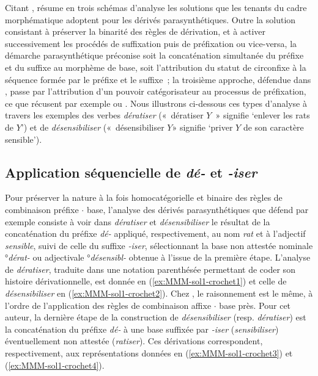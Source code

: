 \documentclass[output=paper]{langsci/langscibook}
\begin{document}
Citant \citet[23-74]{serrano1995.parasinteticas}, \citet[167]{iacobini2004.parasintesi} résume en trois schémas d'analyse les solutions que les tenants du cadre morphématique adoptent pour les dérivés parasynthétiques. Outre la solution consistant à préserver la binarité des règles de dérivation, et à activer successivement les procédés de suffixation puis de préfixation ou vice-versa, la démarche parasynthétique préconise soit la concaténation simultanée du préfixe et du suffixe au morphème de base, soit l'attribution du statut de circonfixe à la séquence formée par le préfixe et le suffixe~; la troisième approche, défendue dans \citet{corbin1980.parasynthese,Corbin87}, passe par l'attribution d'un pouvoir catégorisateur au processus de préfixation, ce que récusent par exemple \citet{scalise1984.Foris} ou \citet{AlcobaRueda1987}.  Nous illustrons ci-dessous ces types d'analyse à travers les exemples des verbes \emph{dératiser} («~dératiser $Y$~» signifie `enlever les rats de $Y$') et de \emph{désensibiliser} («~désensibiliser $Y$» signifie `priver $Y$ de son caractère sensible').

\subsection{Application séquencielle de \emph{\mbox{dé-}} et \emph{\mbox{-iser}}}
\label{sec:MMM-sol1}

Pour préserver la nature à la fois homocatégorielle et binaire des règles de combinaison préfixe $\cdot$ base, l'analyse des dérivés parasynthétiques que défend par exemple \citet{AlcobaRueda1987} consiste à voir dans \emph{dératiser} et \emph{désensibiliser} le résultat de la concaténation du préfixe \emph{\mbox{dé-}} appliqué, respectivement, au nom \emph{rat} et à l'adjectif \emph{sensible}, suivi de celle du suffixe \emph{\mbox{-iser}}, sélectionnant la base non attestée nominale °\emph{\mbox{dérat-}} ou adjectivale °\emph{\mbox{désensibl-}} obtenue à l'issue de la première étape.  L'analyse de \emph{dératiser}, traduite dans une notation parenthésée permettant de coder son histoire dérivationnelle, est donnée en  (\ref{ex:MMM-sol1-crochet1}) et celle de \emph{désensibiliser} en (\ref{ex:MMM-sol1-crochet2}).  Chez \cite{scalise1984.Foris}, le raisonnement est le même, à l'ordre de l'application des règles de combinaison affixe $\cdot$ base près. Pour cet auteur, la dernière étape de la construction de \emph{désensibiliser} (resp. \emph{dératiser}) est la concaténation du préfixe \emph{\mbox{dé-}} à une base suffixée par \emph{\mbox{-iser}} (\emph{sensibiliser}) éventuellement non attestée (\emph{ratiser}). Ces dérivations correspondent, respectivement,  aux représentations données en (\ref{ex:MMM-sol1-crochet3}) et (\ref{ex:MMM-sol1-crochet4}).
\end{document}
